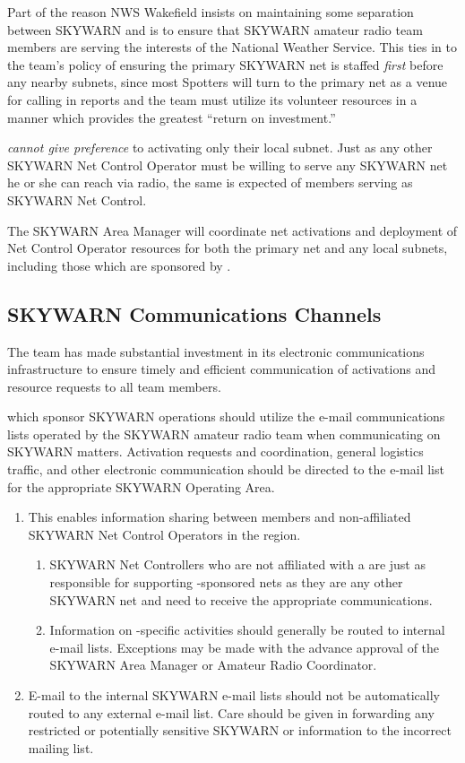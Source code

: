 \documentclass[pdflatex,letterpaper,twoside,12pt]{book}
\begin{document}
Part of the reason NWS Wakefield insists on maintaining some separation between SKYWARN and \tpteams is to ensure that SKYWARN amateur radio team members are serving the interests of the National Weather Service.  This ties in to the team's policy of ensuring the primary SKYWARN net is staffed \emph{first} before any nearby subnets, since most Spotters will turn to the primary net as a venue for calling in reports and the team must utilize its volunteer resources in a manner which provides the greatest ``return on investment.''

\tpteams \emph{cannot give preference} to activating only their local subnet.  Just as any other SKYWARN Net Control Operator must be willing to serve any SKYWARN net he or she can reach via radio, the same is expected of \tpteam members serving as SKYWARN Net Control.

The SKYWARN Area Manager will coordinate net activations and deployment of Net Control Operator resources for both the primary net and any local subnets, including those which are sponsored by \tpteams.


\subsection{SKYWARN Communications Channels}

The team has made substantial investment in its electronic communications infrastructure to ensure timely and efficient communication of activations and resource requests to all team members.

\tpteams which sponsor SKYWARN operations should utilize the e-mail communications lists operated by the SKYWARN amateur radio team when communicating on SKYWARN matters.  Activation requests and coordination, general logistics traffic, and other electronic communication should be directed to the e-mail list for the appropriate SKYWARN Operating Area.

\begin{enumerate}
\item This enables information sharing between \tpteam members and non-affiliated SKYWARN Net Control Operators in the region.
\begin{enumerate}
\item SKYWARN Net Controllers who are not affiliated with a \tpteam are just as responsible for supporting \tpteam-sponsored nets as they are any other SKYWARN net and need to receive the appropriate communications.
\item Information on \tpteam-specific activities should generally be routed to \tpteam internal e-mail lists.  Exceptions may be made with the advance approval of the SKYWARN Area Manager or Amateur Radio Coordinator.
\end{enumerate}
\item E-mail to the internal SKYWARN e-mail lists should not be automatically routed to any external e-mail list.  Care should be given in forwarding any restricted or potentially sensitive SKYWARN or \tpteam information to the incorrect mailing list.
\end{enumerate}
\end{document}

